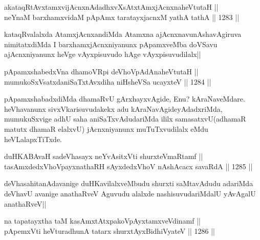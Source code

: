 
\begin{shl}
akataqRtAvxtamxvijAcnxnAdadhxvXsAtxtAmxjAcnxnaheVtutaH || \\
neYnaM barxhamxvidaM pApAmx taratayxjacnxM yathA tathA ||  1283 ||  
\end{shl}

\begin{artha}
kataqRvalalxda AtamxjAcnxandiMda Atamxna ajAcnxnavunAshavAgiruva nimitatxdiMda I barxhamxjAcnxniyanunx pApamxveMba doVSavu ajAcnxniyanunx heVge vAyxpisuvudo hAge vAyxpisuvudilalx||
\end{artha}


\begin{shl}
pApamxshabedxVna dhamoVR\s pi deVhoVpAdAnaheVtutaH || \\
mumukoSxVsatxdaniSaTxtAvxdiha niHsheVSa ucayxteV ||  1284 ||  
\end{shl}

\begin{artha}
pApamxshabadxdiMda dhamaRvU gArxhayxvAgide, Enu? kAraNaveMdare. heVhavanunx sivxVkarisuvudakekx adu kAraNavAgideyAdadxriMda, mumukuSxvige adhU saha aniSaTxvAdudariMda ililx samasatxvU(adhamaR matutx dhamaR elalxvU) jAcnxniyanunx muTuTxvudilalx eMdu heVLalapxTiTxde.
\end{artha}


\begin{shl}
duHKABAvaH sadeVhasayx neYvAsitxVti shurxteVmaRtamf || \\
tasAmxdedxVhoV\s payxnathaRH sAyxdedxVhoV nAshAcacx savaRdA ||  1285 ||  
\end{shl}

\begin{artha}
deVhasahitanAdavanige duHKavilalxveMbudu shurxti saMtavAdudu adariMda deVhavU avanige anathaRveV Aguvudu alalxde nashisuvudariMdalU yAvAgalU anathaRveV||
\end{artha}


\begin{shl}
na tapatayxtha taM kasAmxtAtxpakoV\s pAyxtamxveVdinamf ||  \\
pApemxVti heVturadhunA tatarx shurxtAyx\s BidhiVyateV ||  1286 ||  
\end{shl}

